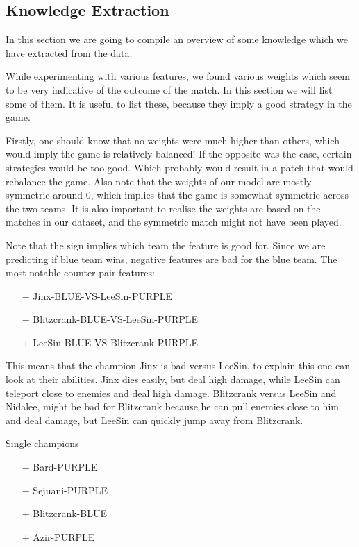 \subsection{Knowledge Extraction}\label{sub:knowledge}
In this section we are going to compile an overview of some knowledge which we have extracted from the data. 

While experimenting with various features, we found various weights which seem to be very indicative of the outcome of the match. In this section we will list some of them. It is useful to list these, because they imply a good strategy in the game.

Firstly, one should know that no weights were much higher than others, which would imply the game is relatively balanced! If the opposite was the case, certain strategies would be too good. Which probably would result in a patch that would rebalance the game. Also note that the weights of our model are mostly symmetric around 0, which implies that the game is somewhat symmetric across the two teams. It is also important to realise the weights are based on the matches in our dataset, and the symmetric match might not have been played. 

Note that the sign implies which team the feature is good for. Since we are predicting if blue team wins, negative features are bad for the blue team. The most notable counter pair features:
\begin{itemize}
    \item[$-$] Jinx-BLUE-VS-LeeSin-PURPLE 
    \item[$-$] Blitzcrank-BLUE-VS-LeeSin-PURPLE 
    \item[$+$] LeeSin-BLUE-VS-Blitzcrank-PURPLE 
\end{itemize} 
This means that the champion Jinx is bad versus LeeSin, to explain this one can look at their abilities. Jinx dies easily, but deal high damage, while LeeSin can teleport close to enemies and deal high damage. Blitzcrank versus LeeSin and Nidalee, might be bad for Blitzcrank because he can pull enemies close to him and deal damage, but LeeSin can quickly jump away from Blitzcrank.

Single champions 
\begin{itemize}
    \item[$-$] Bard-PURPLE 
    \item[$-$] Sejuani-PURPLE
    \item[$+$] Blitzcrank-BLUE 
    \item[$+$] Azir-PURPLE
\end{itemize}

